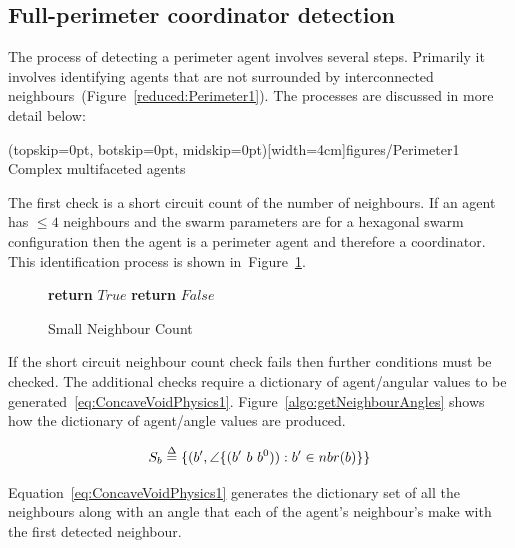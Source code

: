 \documentclass{ieeeaccess}
\begin{document}
\subsection{Full-perimeter coordinator detection}\label{sec:PerimeterAgentDetection} 
The process of detecting a perimeter agent involves several steps. Primarily it involves identifying agents that are not surrounded by interconnected neighbours~(Figure~\ref{reduced:Perimeter1}). The processes are discussed in more detail below: 

\Figure[t!](topskip=0pt, botskip=0pt, midskip=0pt)[width=4cm]{figures/Perimeter1}
{Complex multifaceted agents\label{reduced:Perimeter1}}


The first check is a short circuit count of the number of neighbours. If an agent has $\leq 4$ neighbours and the swarm parameters are for a hexagonal swarm configuration then the agent is a perimeter agent and therefore a coordinator. This identification process is shown in~Figure~\ref{algo:SmallNeighbourCount}. 

\begin{figure}
\begin{algorithmic}
\tiny
{}
   \State\textbf{return} $True$
\EndIf
\State\textbf{return} $False$
\EndProcedure
\end{algorithmic}
\caption{Small Neighbour Count}
\label{algo:SmallNeighbourCount}
\end{figure}

If the short circuit neighbour count check fails then further conditions must be checked. The additional checks require a dictionary of agent/angular values to be generated~\eqref{eq:ConcaveVoidPhysics1}. Figure~\ref{algo:getNeighbourAngles} shows how the dictionary of agent/angle values are produced.   

\begin{equation}
S_b \buildrel \Delta \over = \{(b',\angle\{(b'~b~b^0)) : b' \in nbr(b)\}\}
\label{eq:ConcaveVoidPhysics1}
\end{equation}

Equation~\eqref{eq:ConcaveVoidPhysics1} generates the dictionary set of all the neighbours along with an angle that each of the agent's neighbour's make with the first detected neighbour.
\end{document}
